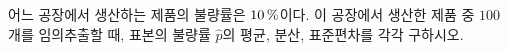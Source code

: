 어느 공장에서 생산하는 제품의 불량률은 $10\mkern3mu \%$이다. 이 공장에서 생산한 제품 중 $100$개를 임의추출할 때, 표본의 불량률 $\hat{p}$의 평균, 분산, 표준편차를 각각 구하시오.
